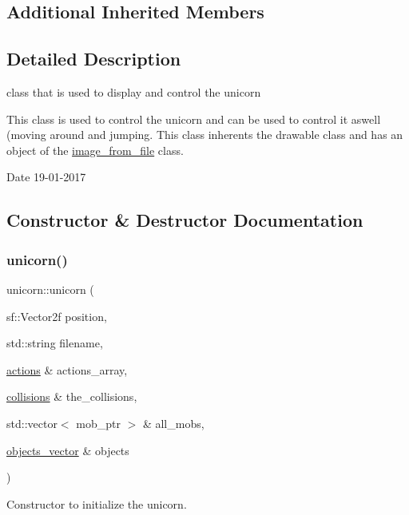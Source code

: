 \subsection*{Additional Inherited Members}


\subsection{Detailed Description}
class that is used to display and control the unicorn 

This class is used to control the unicorn and can be used to control it aswell (moving around and jumping. This class inherents the drawable class and has an object of the \hyperlink{classimage__from__file}{image\+\_\+from\+\_\+file} class.

\begin{DoxyDate}{Date}
19-\/01-\/2017 
\end{DoxyDate}


\subsection{Constructor \& Destructor Documentation}
\mbox{\label{classunicorn_a5106a69c85e9426caf0bc79f48c21ed4}} 
\subsubsection{\texorpdfstring{unicorn()}{unicorn()}}
{\footnotesize\ttfamily unicorn\+::unicorn (\begin{DoxyParamCaption}\item[{sf\+::\+Vector2f}]{position,  }\item[{std\+::string}]{filename,  }\item[{\hyperlink{drawable_8hpp_a38f93e4749e0d65d51360c429766d212}{actions} \&}]{actions\+\_\+array,  }\item[{\hyperlink{drawable_8hpp_a7e1a7f34f6d09dabb4cdafd6e4118603}{collisions} \&}]{the\+\_\+collisions,  }\item[{std\+::vector$<$ mob\+\_\+ptr $>$ \&}]{all\+\_\+mobs,  }\item[{\hyperlink{drawable_8hpp_a6c0fdb1dfd0c34dbbdbb5dcd3c608b07}{objects\+\_\+vector} \&}]{objects }\end{DoxyParamCaption})}



Constructor to initialize the unicorn. 

